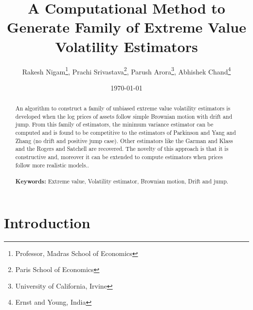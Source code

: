 \documentclass[12pt]{article}   	%
\title{\textbf{A Computational Method to Generate Family of Extreme Value Volatility Estimators}}
\author{Rakesh Nigam\footnote{Professor, Madras School of Economics}, Prachi Srivastava\footnote{Paris School of Economics}, Parush Arora\footnote{University of California, Irvine}, Abhishek Chand\footnote{Ernst and Young, India}}
\date{\today}
\begin{document}
  

\maketitle
\begin{abstract}
An algorithm to construct a family of unbiased extreme value volatility estimators is developed when the log prices of assets follow 
simple Brownian motion with drift and jump. From this family of estimators, the minimum variance estimator can be computed and 
is found to be competitive to the estimators of Parkinson and Yang and Zhang (no drift and positive jump case). 
Other estimators like the Garman and Klass and the Rogers and Satchell  are recovered. 
The novelty of this approach is that it is constructive and, moreover it can be extended to compute estimators when prices follow more realistic models..\\
\\ \textbf{Keywords: }Extreme value, Volatility estimator, Brownian motion, Drift and jump.
\end{abstract}

\renewcommand{\footnoterule}{%
  \kern -3pt
  \hrule width \textwidth height 1pt
  \kern 2pt
}

\newpage
\tableofcontents
\newpage
\section{Introduction}
\label{sec:intro}
\end{document}
